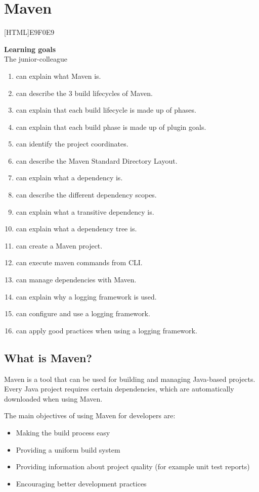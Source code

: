 \chapter{Maven}
\label{chap:maven}

[HTML]{E9F0E9}{\parbox{\textwidth}{%
\noindent \textbf{Learning goals}\\
The junior-colleague
\begin{enumerate}[nolistsep]
\item can explain what Maven is.
\item can describe the 3 build lifecycles of Maven.
\item can explain that each build lifecycle is made up of phases.
\item can explain that each build phase is made up of plugin goals.
\item can identify the project coordinates.
\item can describe the Maven Standard Directory Layout.
\item can explain what a dependency is.
\item can describe the different dependency scopes.
\item can explain what a transitive dependency is.
\item can explain what a dependency tree is.
\item can create a Maven project.
\item can execute maven commands from CLI.
\item can manage dependencies with Maven.
\item can explain why a logging framework is used.
\item can configure and use a logging framework.
\item can apply good practices when using a logging framework.
\end{enumerate}}}

\section{What is Maven?}

Maven is a tool that can be used for building and managing Java-based projects.
Every Java project requires certain dependencies, which are automatically downloaded when using Maven.

The main objectives of using Maven for developers are:
\begin{itemize}
\item Making the build process easy
\item Providing a uniform build system
\item Providing information about project quality (for example unit test reports)
\item Encouraging better development practices
\end{itemize}

